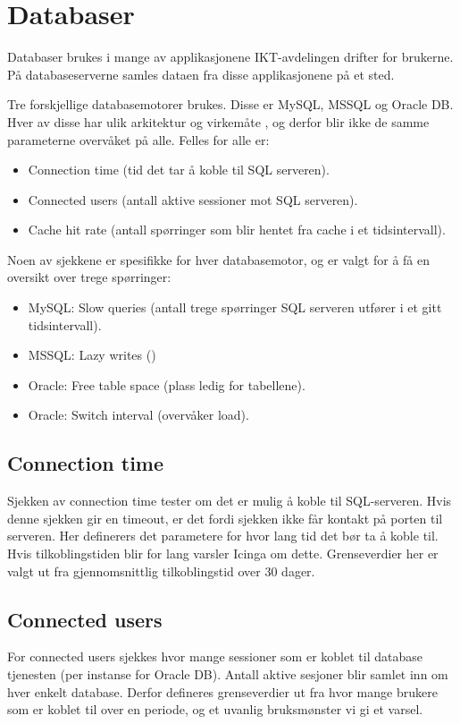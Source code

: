 \section{Databaser}
Databaser brukes i mange av applikasjonene IKT-avdelingen drifter for brukerne. På databaseserverne samles dataen fra disse applikasjonene på et sted. 

Tre forskjellige databasemotorer brukes. Disse er MySQL, MSSQL og Oracle DB. Hver av disse har ulik arkitektur og virkemåte \cite{databasecomparison}, og derfor blir ikke de samme parameterne overvåket på alle. Felles for alle er:
\begin{itemize}
	\item Connection time (tid det tar å koble til SQL serveren).
	\item Connected users (antall aktive sessioner mot SQL serveren).
	\item Cache hit rate (antall spørringer som blir hentet fra cache i et tidsintervall).
\end{itemize}

Noen av sjekkene er spesifikke for hver databasemotor, og er valgt for å få en oversikt over trege spørringer:
\begin{itemize}
\item MySQL: Slow queries (antall trege spørringer SQL serveren utfører i et gitt tidsintervall).
\item MSSQL: Lazy writes ()
\item Oracle: Free table space (plass ledig for tabellene).
\item Oracle: Switch interval (overvåker load).
\end{itemize}

\subsection*{Connection time}
Sjekken av connection time tester om det er mulig å koble til SQL-serveren. Hvis denne sjekken gir en timeout, er det fordi sjekken ikke får kontakt på porten til serveren. Her definerers det parametere for hvor lang tid det bør ta å koble til. Hvis tilkoblingstiden blir for lang varsler Icinga om dette. Grenseverdier her er valgt ut fra gjennomsnittlig tilkoblingstid over 30 dager.

\subsection*{Connected users}
For connected users sjekkes hvor mange sessioner som er koblet til database tjenesten (per instanse for Oracle DB). Antall aktive sesjoner blir samlet inn om hver enkelt database. Derfor defineres grenseverdier ut fra hvor mange brukere som er koblet til over en periode, og et uvanlig bruksmønster vi gi et varsel.

